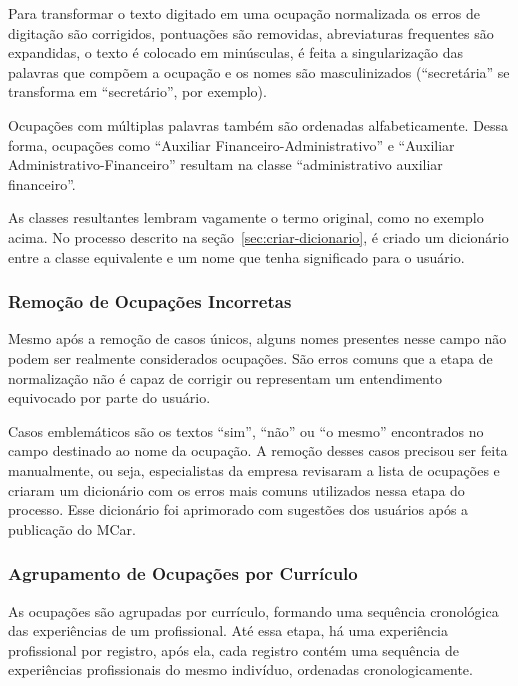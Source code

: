 \documentclass[12pt,a4paper]{article}
\theoremstyle{hypo}
\begin{document}
Para transformar o texto digitado em uma ocupação normalizada os erros de digitação são corrigidos, pontuações são removidas, abreviaturas frequentes são expandidas, o texto é colocado em minúsculas, é feita a singularização das palavras que compõem a ocupação e os nomes são masculinizados (\enquote{secretária} se transforma em \enquote{secretário}, por exemplo).

Ocupações com múltiplas palavras também são ordenadas alfabeticamente. Dessa forma, ocupações como \enquote{Auxiliar Financeiro-Administrativo} e \enquote{Auxiliar Administrativo-Financeiro} resultam na classe \enquote{administrativo auxiliar financeiro}.

As classes resultantes lembram vagamente o termo original, como no exemplo acima. No processo descrito na seção~\ref{sec:criar-dicionario}, é criado um dicionário entre a classe equivalente e um nome que tenha significado para o usuário.

\subsubsection{Remoção de Ocupações Incorretas} \label{sec:remocao-ocupacoes-incorretas}

Mesmo após a remoção de casos únicos, alguns nomes presentes nesse campo não podem ser realmente considerados ocupações. São erros comuns que a etapa de normalização não é capaz de corrigir ou representam um entendimento equivocado por parte do usuário.

Casos emblemáticos são os textos \enquote{sim}, \enquote{não} ou \enquote{o mesmo} encontrados no campo destinado ao nome da ocupação. A remoção desses casos precisou ser feita manualmente, ou seja, especialistas da empresa revisaram a lista de ocupações e criaram um dicionário com os erros mais comuns utilizados nessa etapa do processo. Esse dicionário foi aprimorado com sugestões dos usuários após a publicação do MCar.

\subsubsection{Agrupamento de Ocupações por Currículo}

As ocupações são agrupadas por currículo, formando uma sequência cronológica das experiências de um profissional. Até essa etapa, há uma experiência profissional por registro, após ela, cada registro contém uma sequência de experiências profissionais do mesmo indivíduo, ordenadas cronologicamente.
\end{document}
